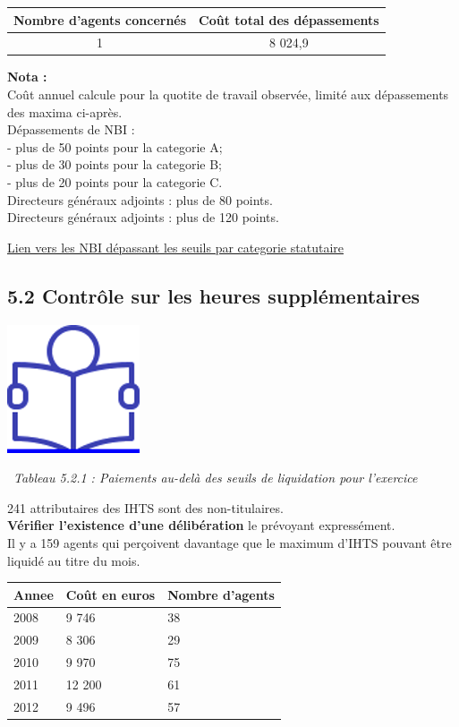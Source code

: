 \begin{longtable}[]{@{}cc@{}}
\toprule
Nombre d'agents concernés & Coût total des dépassements\tabularnewline
\midrule
\endhead
1 & 8 024,9\tabularnewline
\bottomrule
\end{longtable}

\textbf{Nota :}\\
Coût annuel calcule pour la quotite de travail observée, limité aux
dépassements des maxima ci-après.\\
Dépassements de NBI :\\
- plus de 50 points pour la categorie A;\\
- plus de 30 points pour la categorie B;\\
- plus de 20 points pour la categorie C.\\
Directeurs généraux adjoints : plus de 80 points.\\
Directeurs généraux adjoints : plus de 120 points.

\href{../Bases/Reglementation/NBI.cat.irreg.csv}{Lien vers les NBI
dépassant les seuils par categorie statutaire}

\hypertarget{controle-sur-les-heures-supplementaires}{%
\subsection{5.2 Contrôle sur les heures
supplémentaires}\label{controle-sur-les-heures-supplementaires}}

\href{../Docs/Notices/fiche_IHTS.odt}{\includegraphics{icones/Notice.png}}

~\emph{Tableau 5.2.1 : Paiements au-delà des seuils de liquidation pour
l'exercice}

241 attributaires des IHTS sont des non-titulaires.\\
\textbf{Vérifier l'existence d'une délibération} le prévoyant
expressément.\\
Il y a 159 agents qui perçoivent davantage que le maximum d'IHTS pouvant
être liquidé au titre du mois.

\begin{longtable}[]{@{}lll@{}}
\toprule
Annee & Coût en euros & Nombre d'agents\tabularnewline
\midrule
\endhead
2008 & 9 746 & 38\tabularnewline
2009 & 8 306 & 29\tabularnewline
2010 & 9 970 & 75\tabularnewline
2011 & 12 200 & 61\tabularnewline
2012 & 9 496 & 57\tabularnewline
\bottomrule
\end{longtable}

